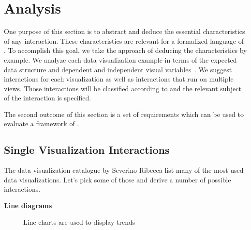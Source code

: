 \chapter{Analysis}\label{sec:analysis}
One purpose of this section is to abstract and deduce the essential characteristics of any interaction.
These characteristics are relevant for a formalized language of \cmvs{}.
To accomplish this goal, we take the approach of deducing the characteristics by example.
We analyze each data visualization example in terms of the expected data structure and dependent and independent visual variables~\cite{Bertin2010}.
We suggest interactions for each visualization as well as interactions that run on multiple views.
Those interactions will be classified according to \textcite{Yi2007} and the relevant subject of the interaction is specified.

The second outcome of this section is a set of requirements which can be used to evaluate a framework of \cmvs{}.


\section{Single Visualization Interactions}\label{sec:analysis:examples:single}

The data visualization catalogue by Severino Ribecca list many of the most used data visualizations\cite{VisualizationCatalogue2017}.
Let's pick some of those and derive a number of possible interactions.



\textbf{Line diagrams}
\begin{figure}
  \begin{center}
    \qquad
  \end{center}
  \caption{Line charts are used to display trends}\label{fig:concept:chart-types:line-diagrams}
\end{figure}

